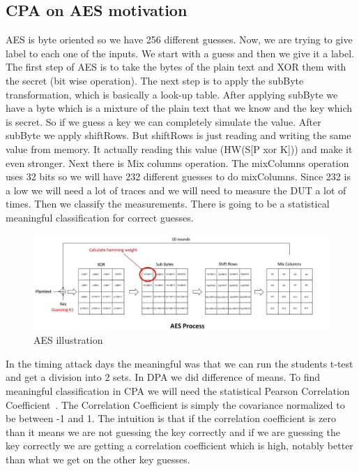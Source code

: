 \subsection{CPA on AES motivation}

AES is byte oriented so we have 256 different guesses. Now, we are trying to give label to each one of the inputs. We start with a guess and then we give it a label. The first step of AES is to take the bytes of the plain text and XOR them with the secret (bit wise operation). The next step is to apply the subByte transformation, which is basically a look-up table. After applying subByte we have a byte which is a mixture of the plain text that we know and the key which is secret. So if we guess a key we can completely simulate the value. After subByte we apply shiftRows. But shiftRows is just reading and writing the same value from memory. It actually reading this value (HW(S[P xor K])) and make it even stronger. Next there is Mix columns operation. The mixColumns operation uses 32 bits so we will have 232 different guesses to do mixColumns. Since 232 is a low we will need a lot of traces and we will need to measure the DUT a lot of times. Then we classify the measurements. There is going to be a statistical meaningful classification for correct guesses.

\begin{figure}[!ht]
    \centering
    \includegraphics[width=1.0\textwidth]{images/chapter8/aes_process.jpg}
    \caption{AES illustration} \label{c8_aes:fig}
\end{figure}

In the timing attack days the meaningful was that we can run the students t-test and get a division into 2 sets. In DPA we did  difference of means. To find meaningful classification in CPA we will need the statistical Pearson Correlation Coefficient~\cite{PearsonCorrelationCoefficient}. The Correlation Coefficient is simply the covariance normalized to be between -1 and 1. The intuition is that if the correlation coefficient is zero than it means we are not guessing the key correctly and if we are guessing the key correctly we are getting a correlation coefficient which is high, notably better than what we get on the other key guesses. 

